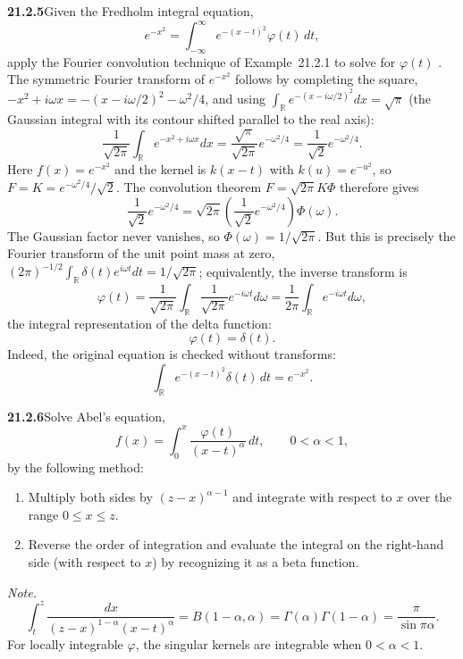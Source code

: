 \par\bigskip
\noindent\textbf{21.2.5}\quad Given the Fredholm integral
equation,
\[
e^{-x^{2}}=\int_{-\infty}^{\infty}e^{-(x-t)^{2}}\varphi(t)\,dt,
\]
apply the Fourier convolution technique of Example~21.2.1 to solve
for $\varphi(t)$ .
\solution
The symmetric Fourier transform of $e^{-x^2}$ follows by completing the
square, $-x^2+i\omega x=-(x-i\omega/2)^2-\omega^2/4$, and using
$\int_{\mathbb R}e^{-(x-i\omega/2)^2}dx=\sqrt\pi$ (the Gaussian integral
with its contour shifted parallel to the real axis):
\[
\frac1{\sqrt{2\pi}}\int_{\mathbb R}
e^{-x^2+i\omega x}dx=\frac{\sqrt\pi}{\sqrt{2\pi}}e^{-\omega^2/4}
=\frac1{\sqrt2}e^{-\omega^2/4}.
\]
Here $f(x)=e^{-x^2}$ and the kernel is $k(x-t)$ with $k(u)=e^{-u^2}$,
so $F=K=e^{-\omega^2/4}/\sqrt2$. The convolution theorem
$F=\sqrt{2\pi}K\Phi$ therefore gives
\[
\frac1{\sqrt2}e^{-\omega^2/4}
=\sqrt{2\pi}\left(\frac1{\sqrt2}e^{-\omega^2/4}\right)
\Phi(\omega).
\]
The Gaussian factor never vanishes, so
$\Phi(\omega)=1/\sqrt{2\pi}$. But this is precisely the Fourier
transform of the unit point mass at zero,
$(2\pi)^{-1/2}\int_{\mathbb R}\delta(t)e^{i\omega t}dt=1/\sqrt{2\pi}$;
equivalently, the inverse transform is
\[
\varphi(t)=\frac1{\sqrt{2\pi}}\int_{\mathbb R}
\frac1{\sqrt{2\pi}}e^{-i\omega t}d\omega
=\frac1{2\pi}\int_{\mathbb R}e^{-i\omega t}d\omega,
\]
the integral representation of the delta function:
\[
\boxed{\varphi(t)=\delta(t)}.
\]
Indeed, the original equation is checked without transforms:
\[
\int_{\mathbb R}e^{-(x-t)^2}\delta(t)\,dt=e^{-x^2}.
\]


\par\bigskip
\noindent\textbf{21.2.6}\quad Solve Abel's equation,
\[
f(x)=\int_{0}^{x}\frac{\varphi(t)}{(x-t)^{\alpha}}\,dt,
\qquad0<\alpha<1,
\]
by the following method:
\begin{enumerate}
\item[(a)] Multiply both sides by $(z-x)^{\alpha-1}$ and integrate
with respect to $x$ over the range $0\le x\le z$.
\item[(b)] Reverse the order of integration and evaluate the
integral on the right-hand side (with respect to $x$) by
recognizing it as a beta function.
\end{enumerate}
\par\emph{Note.}
\[
\int_{t}^{z}\frac{dx}{(z-x)^{1-\alpha}(x-t)^{\alpha}}
=B(1-\alpha,\alpha)=\Gamma(\alpha)\Gamma(1-\alpha)
=\frac{\pi}{\sin\pi\alpha}.
\]
\solution
For locally integrable $\varphi$, the singular kernels are integrable
when $0<\alpha<1$.

